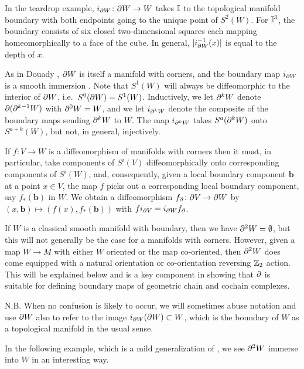 In the teardrop example, $i_{\partial W} \colon \partial W \to W$ takes $\mathbb{I}$ to the topological manifold boundary with both endpoints going to the unique point of $S^2(W)$.
For $\mathbb{I}^3$, the boundary consists of six closed two-dimensional squares each mapping homeomorphically to a face of the cube.
In general, $|i_{\partial W}^{-1}(x)|$ is equal to the depth of $x$.

As in Douady \cite{Doua61}, $\partial W$ is itself a manifold with corners, and the boundary map $i_{\partial W}$ is a smooth immersion \cite[Theorem 3.4]{Joy12}. Note that $S^1(W)$ will always be diffeomorphic to the interior of $\partial W$, i.e.\ $S^0(\partial W) = S^1(W)$.
Inductively, we let $\partial^k W$ denote $\partial (\partial^{k-1} W)$ with $\partial^0 W = W$, and we let $i_{\partial^k W}$ denote the composite of the boundary maps sending $\partial^k W$ to $W$. The map $i_{\partial^k W}$ takes $S^a(\partial^k W)$ onto $S^{a+k}(W)$, but not, in general, injectively.

\begin{remark}\label{R: bd diff}
	If $f \colon V \to W$ is a diffeomorphism of manifolds with corners then it must, in particular, take components of $S^i(V)$ diffeomorphically onto corresponding components of $S^i(W)$, and, consequently, given a local boundary component $\mathbf{b}$ at a point $x \in V$, the map $f$ picks out a corresponding local boundary component, say $f_*(\mathbf{b})$ in $W$. We obtain a diffeomorphism $f_\partial \colon \partial V \to \partial W$ by $(x,\mathbf{b})\mapsto (f(x),f_*(\mathbf{b}))$ with $fi_{\partial V} = i_{\partial W} f_\partial$.
\end{remark}

If $W$ is a classical smooth manifold with boundary, then we have $\partial^2 W=\emptyset$, but this will not generally be the case for a manifolds with corners.
However, given a map $W \to M$ with either $W$ oriented or the map co-oriented, then $\partial^2 W$ does come equipped with a natural orientation or co-orientation reversing $\mathbb{Z}_2$ action.
This will be explained below and is a key component in showing that $\partial$ is suitable for defining boundary maps of geometric chain and cochain complexes.

N.B. When no confusion is likely to occur, we will sometimes abuse notation and use $\partial W$ also to refer to the image $i_{\partial W}(\partial W) \subset W$, which is the boundary of $W$ as a topological manifold in the usual sense.

In the following example, which is a mild generalization of \cite[Example 7.3]{Joy12}, we see $\partial^2 W$ immerse into $W$ in an interesting way.

